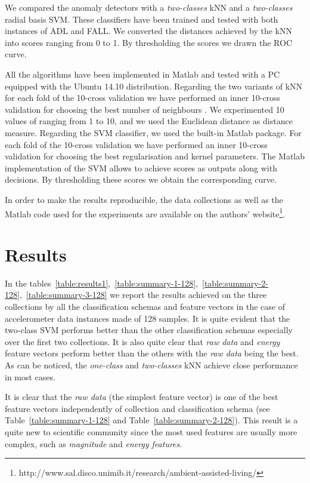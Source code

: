 \documentclass[twocolumn]{svjour3}          \smartqed  \usepackage[draft]{hyperref}
\begin{document}
We compared the anomaly detectors with a \emph{two-classes} kNN and a \emph{two-classes} radial basis SVM. These classifiers have been trained and tested with both instances of ADL and FALL. We converted the distances achieved by the kNN into scores ranging from 0 to 1. By thresholding the scores we drawn the ROC curve.

All the algorithms have been implemented in Matlab and tested with a PC equipped with the Ubuntu 14.10 distribution. Regarding the two variants of kNN for each fold of the 10-cross validation we have performed an inner 10-cross validation for choosing the best number of neighbours . We  experimented 10 values of  ranging from 1 to 10, and we used the Euclidean distance as distance measure. Regarding the SVM classifier, we used the built-in Matlab package. For each fold of the 10-cross validation we have performed an inner 10-cross validation for choosing the best regularisation and kernel parameters. The Matlab implementation of the SVM allows to achieve scores as outputs along with decisions. By thresholding these scores we obtain the corresponding   curve.

In order to make the results reproducible,  the data collections as well as the Matlab code used for the experiments are available on the authors' website\footnote{http://www.sal.disco.unimib.it/research/ambient-assisted-living/}.

\section{Results} \label{sec:results}
In the tables~\ref{table:results1},~\ref{table:summary-1-128},~\ref{table:summary-2-128},~\ref{table:summary-3-128} we report the results achieved on the three collections by all the classification schemas and feature vectors in the case of accelerometer data instances made of 128 samples. It is quite evident that the two-class SVM performs better than the other classification schemas especially over the first two collections. It is also quite clear that \emph{raw data} and \emph{energy} feature vectors perform better than the others with the  \emph{raw data} being the best. As can be noticed, the \emph{one-class} and \emph{two-classes} kNN achieve close performance in most cases. 

It is clear that the \emph{raw data} (the simplest feature vector) is one of the best feature vectors independently of collection and classification schema (see Table~\ref{table:summary-1-128} and Table~\ref{table:summary-2-128}). This result is a quite new to scientific community since the most used features are usually more complex, such as \emph{magnitude} and \emph{energy features}.
\end{document}
